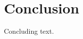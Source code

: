 \documentclass[dareport.tex]{subfiles}
\begin{document}
\section{Conclusion}
Concluding text.
\end{document}
